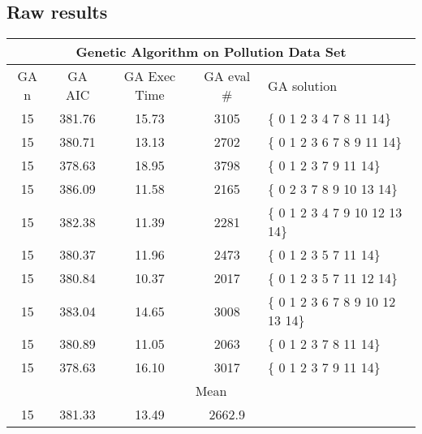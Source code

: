 \subsection{Raw results}
\label{pollRaw}
\begin{tabular}{|c|c|c|c|l|}
	\hline
	\multicolumn{5}{|c|}{Genetic Algorithm on Pollution Data Set}                                     \\ \hline
	GA n & GA AIC      & GA Exec Time & GA eval \# & GA solution                      \\ \hline
	15   & 381.76 & 15.73            & 3105                  & \{ 0 1 2 3 4 7 8 11 14\}         \\ \hline
	15   & 380.71  & 13.13            & 2702                  & \{ 0 1 2 3 6 7 8 9 11 14\}       \\ \hline
	15   & 378.63 & 18.95            & 3798                  & \{ 0 1 2 3 7 9 11 14\}           \\ \hline
	15   & 386.09 & 11.58            & 2165                  & \{ 0 2 3 7 8 9 10 13 14\}        \\ \hline
	15   & 382.38 & 11.39             & 2281                  & \{ 0 1 2 3 4 7 9 10 12 13 14\}   \\ \hline
	15   & 380.37 & 11.96            & 2473                  & \{ 0 1 2 3 5 7 11 14\}           \\ \hline
	15   & 380.84 & 10.37            & 2017                  & \{ 0 1 2 3 5 7 11 12 14\}        \\ \hline
	15   & 383.04 & 14.65            & 3008                  & \{ 0 1 2 3 6 7 8 9 10 12 13 14\} \\ \hline
	15   & 380.89 & 11.05            & 2063                  & \{ 0 1 2 3 7 8 11 14\}           \\ \hline
	15   & 378.63 & 16.10            & 3017                  & \{ 0 1 2 3 7 9 11 14\}           \\ \hline
	\multicolumn{5}{|c|}{Mean}                                                                        \\ \hline
	15   & 381.33 & 13.49           & 2662.9                &                                  \\ \hline
\end{tabular}

